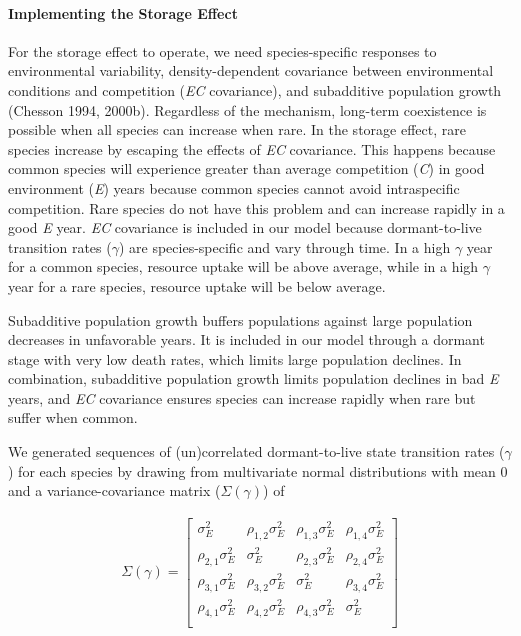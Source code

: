 \documentclass[12pt,]{article}
\begin{document}
\paragraph{Implementing the Storage
Effect}\label{implementing-the-storage-effect}

For the storage effect to operate, we need species-specific responses to
environmental variability, density-dependent covariance between
environmental conditions and competition (\emph{EC} covariance), and
subadditive population growth (Chesson 1994, 2000b). Regardless of the
mechanism, long-term coexistence is possible when all species can
increase when rare. In the storage effect, rare species increase by
escaping the effects of \emph{EC} covariance. This happens because
common species will experience greater than average competition
(\emph{C}) in good environment (\emph{E}) years because common species
cannot avoid intraspecific competition. Rare species do not have this
problem and can increase rapidly in a good \emph{E} year. \emph{EC}
covariance is included in our model because dormant-to-live transition
rates (\(\gamma\)) are species-specific and vary through time. In a high
\(\gamma\) year for a common species, resource uptake will be above
average, while in a high \(\gamma\) year for a rare species, resource
uptake will be below average.

Subadditive population growth buffers populations against large
population decreases in unfavorable years. It is included in our model
through a dormant stage with very low death rates, which limits large
population declines. In combination, subadditive population growth
limits population declines in bad \emph{E} years, and \emph{EC}
covariance ensures species can increase rapidly when rare but suffer
when common.

We generated sequences of (un)correlated dormant-to-live state
transition rates (\(\gamma\)) for each species by drawing from
multivariate normal distributions with mean 0 and a variance-covariance
matrix (\(\Sigma(\gamma)\)) of

\begin{align}
\Sigma(\gamma) = 
\begin{bmatrix}
\sigma^2_{E} & \rho_{1,2}\sigma^2_{E} & \rho_{1,3}\sigma^2_{E} & \rho_{1,4}\sigma^2_{E} \\
\rho_{2,1}\sigma^2_{E} & \sigma^2_{E} & \rho_{2,3}\sigma^2_{E} & \rho_{2,4}\sigma^2_{E} \\
\rho_{3,1}\sigma^2_{E} & \rho_{3,2}\sigma^2_{E} & \sigma^2_{E}  & \rho_{3,4}\sigma^2_{E} \\
\rho_{4,1}\sigma^2_{E} & \rho_{4,2}\sigma^2_{E} & \rho_{4,3}\sigma^2_{E} & \sigma^2_{E}  \\
\end{bmatrix}
\end{align}
\end{document}
